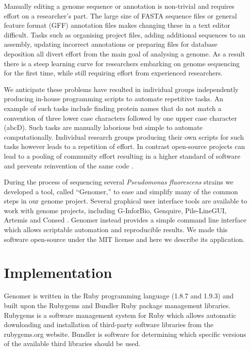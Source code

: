 \documentclass[10pt]{article}
\begin{document}
Manually editing a genome sequence or annotation is non-trivial and requires
effort on a researcher's part. The large size of FASTA sequence files or
general feature format (GFF) annotation files makes changing these in a text
editor difficult. Tasks such as organising project files, adding additional
sequences to an assembly, updating incorrect annotations or preparing files for
database deposition all divert effort from the main goal of analysing a genome.
As a result there is a steep learning curve for researchers embarking on genome
sequencing for the first time, while still requiring effort from experienced
researchers.

We anticipate these problems have resulted in individual groups independently
producing in-house programming scripts to automate repetitive tasks. An example
of such tasks include finding protein names that do not match a convention of
three lower case characters followed by one upper case character (abcD). Such
tasks are manually laborious but simple to automate computationally. Individual
research groups producing their own scripts for such tasks however leads to a
repetition of effort. In contrast open-source projects can lead to a pooling of
community effort resulting in a higher standard of software and prevents
reinvention of the same code \cite{ince2012}.

During the process of sequencing several \emph{Pseudomonas fluorescens} strains
we developed a tool, called ``Genomer,'' to ease and simplify many of the
common steps in our genome project. Several graphical user interface tools are
available to work with genome projects, including G-InforBio, Genquire,
Pile-LineGUI, Artemis and Consed \cite{tanaka2006, wilkinson2002, lopez2011,
carver2012, gordon1998}. Genomer instead provides a simple command line
interface which allows scriptable automation and reproducible results. We made
this software open-source under the MIT license and here we describe its
application.

\section*{Implementation}

Genomer is written in the Ruby programming language (1.8.7 and 1.9.3)
\cite{ruby-lang,goto2010} and built upon the Rubygems and Bundler Ruby package
management libraries. Rubygems is a software management system for Ruby which
allows automatic downloading and installation of third-party software libraries
from the rubygems.org website. Bundler is software for determining which
specific versions of the available third libraries should be used.
\end{document}
